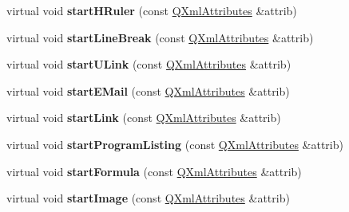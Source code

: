 \begin{DoxyCompactItemize}
\item 
\hypertarget{class_paragraph_handler_a732b339fe1cad4aad37026bf49e56139}{virtual void {\bfseries start\-H\-Ruler} (const \hyperlink{class_q_xml_attributes}{Q\-Xml\-Attributes} \&attrib)}\label{class_paragraph_handler_a732b339fe1cad4aad37026bf49e56139}

\item 
\hypertarget{class_paragraph_handler_a4ef850515992ba3cdd4e09897a4517c5}{virtual void {\bfseries start\-Line\-Break} (const \hyperlink{class_q_xml_attributes}{Q\-Xml\-Attributes} \&attrib)}\label{class_paragraph_handler_a4ef850515992ba3cdd4e09897a4517c5}

\item 
\hypertarget{class_paragraph_handler_a55c1d3b6592e7b365030535c2d558e42}{virtual void {\bfseries start\-U\-Link} (const \hyperlink{class_q_xml_attributes}{Q\-Xml\-Attributes} \&attrib)}\label{class_paragraph_handler_a55c1d3b6592e7b365030535c2d558e42}

\item 
\hypertarget{class_paragraph_handler_a10b3ee7bb8e8ffea0fa0db0a366e7c68}{virtual void {\bfseries start\-E\-Mail} (const \hyperlink{class_q_xml_attributes}{Q\-Xml\-Attributes} \&attrib)}\label{class_paragraph_handler_a10b3ee7bb8e8ffea0fa0db0a366e7c68}

\item 
\hypertarget{class_paragraph_handler_a537fb712d08bab9c4ad5812a84f7a4b3}{virtual void {\bfseries start\-Link} (const \hyperlink{class_q_xml_attributes}{Q\-Xml\-Attributes} \&attrib)}\label{class_paragraph_handler_a537fb712d08bab9c4ad5812a84f7a4b3}

\item 
\hypertarget{class_paragraph_handler_ae03e5c8c64478d96c0e32aa7738e16b6}{virtual void {\bfseries start\-Program\-Listing} (const \hyperlink{class_q_xml_attributes}{Q\-Xml\-Attributes} \&attrib)}\label{class_paragraph_handler_ae03e5c8c64478d96c0e32aa7738e16b6}

\item 
\hypertarget{class_paragraph_handler_a26fc2208b8728045a78a977ae9e1961c}{virtual void {\bfseries start\-Formula} (const \hyperlink{class_q_xml_attributes}{Q\-Xml\-Attributes} \&attrib)}\label{class_paragraph_handler_a26fc2208b8728045a78a977ae9e1961c}

\item 
\hypertarget{class_paragraph_handler_a56db971619d18aec03a3ac9e5554b271}{virtual void {\bfseries start\-Image} (const \hyperlink{class_q_xml_attributes}{Q\-Xml\-Attributes} \&attrib)}\label{class_paragraph_handler_a56db971619d18aec03a3ac9e5554b271}


\end{DoxyCompactItemize}

